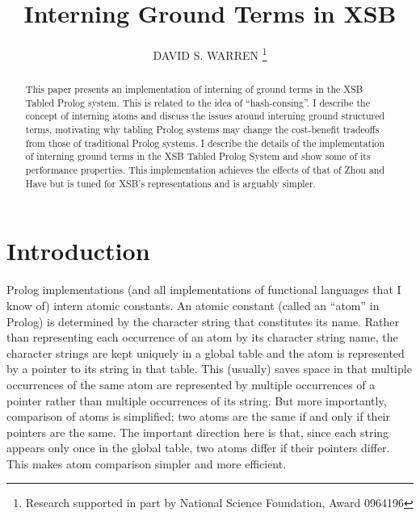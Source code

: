 \documentclass{llncs}
\begin{document}
\frontmatter          \pagestyle{headings}  
\title{Interning Ground Terms in XSB}
  \author{DAVID S. WARREN
        \thanks{Research supported in part by National Science Foundation, Award 0964196}
}
   

\maketitle              
\begin{abstract}

This paper presents an implementation of interning of ground terms in
the XSB Tabled Prolog system.  This is related to the idea of
``hash-consing''.  I describe the concept of interning atoms and
discuss the issues around interning ground structured terms,
motivating why tabling Prolog systems may change the cost-benefit
tradeoffs from those of traditional Prolog systems.  I describe the
details of the implementation of interning ground terms in the XSB
Tabled Prolog System and show some of its performance properties.
This implementation achieves the effects of that of Zhou and Have
\cite{zhou-hash-consing} but is tuned for XSB's representations and is
arguably simpler.
\end{abstract}
\section{Introduction}

Prolog implementations (and all implementations of functional
languages that I know of) intern atomic constants.  An atomic constant
(called an ``atom'' in Prolog) is determined by the character string
that constitutes its name.  Rather than representing each occurrence
of an atom by its character string name, the character strings are
kept uniquely in a global table and the atom is represented by a
pointer to its string in that table.  This (usually) saves space in
that multiple occurrences of the same atom are represented by multiple
occurrences of a pointer rather than multiple occurrences of its
string.  But more importantly, comparison of atoms is simplified; two
atoms are the same if and only if their pointers are the same.  The
important direction here is that, since each string appears only once
in the global table, two atoms differ if their pointers differ.  This
makes atom comparison simpler and more efficient.
\end{document}
